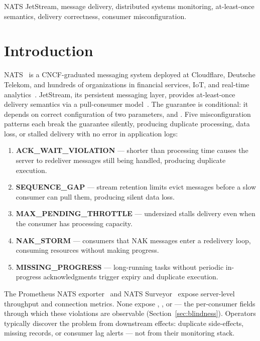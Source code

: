 \documentclass[journal]{IEEEtran}
\begin{document}
\begin{IEEEkeywords}
NATS JetStream, message delivery, distributed systems monitoring,
at-least-once semantics, delivery correctness, consumer misconfiguration.
\end{IEEEkeywords}

\section{Introduction}
\label{sec:intro}

NATS~\cite{nats-docs} is a CNCF-graduated messaging system deployed at
Cloudflare, Deutsche Telekom, and hundreds of organizations in financial
services, IoT, and real-time analytics~\cite{nats-server}. JetStream,
its persistent messaging layer, provides at-least-once delivery semantics
via a pull-consumer model~\cite{gray1992,tanenbaum}. The guarantee is
conditional: it depends on correct configuration of two parameters,
 and . Five misconfiguration patterns
each break the guarantee silently, producing duplicate processing, data
loss, or stalled delivery with no error in application logs:

\begin{enumerate}
\item \textbf{ACK\_WAIT\_VIOLATION} ---  shorter than
  processing time causes the server to redeliver messages still being
  handled, producing duplicate execution.
\item \textbf{SEQUENCE\_GAP} --- stream retention limits evict messages
  before a slow consumer can pull them, producing silent data loss.
\item \textbf{MAX\_PENDING\_THROTTLE} --- undersized 
  stalls delivery even when the consumer has processing capacity.
\item \textbf{NAK\_STORM} --- consumers that NAK messages enter a
  redelivery loop, consuming resources without making progress.
\item \textbf{MISSING\_PROGRESS} --- long-running tasks without periodic
  in-progress acknowledgments trigger  expiry and
  duplicate execution.
\end{enumerate}

The Prometheus NATS exporter~\cite{prometheus-nats} and NATS
Surveyor~\cite{surveyor} expose server-level throughput and connection
metrics. None expose , , or
 --- the per-consumer fields through which
these violations are observable (Section~\ref{sec:blindness}). Operators
typically discover the problem from downstream effects: duplicate
side-effects, missing records, or consumer lag alerts --- not from their
monitoring stack.
\end{document}
